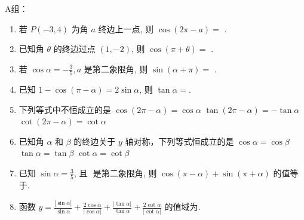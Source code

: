 A组：
\begin{enumerate}
\item 若 $P\left(-3,4\right)$ 为角 $a$ 终边上一点, 则 $\cos \left(2 \pi-a\right)=$ .
\item 已知角 $\theta$ 的终边过点 $\left(1,-2\right)$, 则 $\cos \left(\pi+\theta\right)=$ .
\item 若 $\cos \alpha=-\frac{3}{5}, a$ 是第二象限角, 则 $\sin \left(\alpha+\pi\right)=$ .
\item 已知 $1-\cos \left(\pi-\alpha\right)=2 \sin \alpha$, 则 $\tan \alpha=$.
\item 下列等式中不恒成立的是
\xx{$\sin \left(2 \pi-\alpha\right)=-\sin \alpha$}
{$\cos \left(2 \pi-\alpha\right)=\cos \alpha$}
{$\tan \left(2 \pi-\alpha\right)=-\tan \alpha$}
{$\cot \left(2 \pi-\alpha\right)=\cot \alpha$}

\item 已知角 $\alpha$ 和 $\beta$ 的终边关于 $y$ 轴对称，下列等式恒成立的是
\xx{$\sin \alpha=\sin \beta$}
{$\cos \alpha=\cos \beta$}
{$\tan \alpha=\tan \beta$}
{$\cot \alpha=\cot \beta$}

\item 已知 $\sin \alpha=\frac{3}{5}$, 且 $\textbf{}$ 是第二象限角, 则 $\cos \left(\pi-\alpha\right)+\sin \left(\pi+\alpha\right)$ 的值等于.

\item 函数 $y=\frac{|\sin \alpha|}{\sin \alpha}+\frac{2 \cos \alpha}{|\cos \alpha|}+\frac{|\tan \alpha|}{\tan \alpha}+\frac{2 \cot \alpha}{|\cot \alpha|}$ 的值域为.


\end{enumerate}

